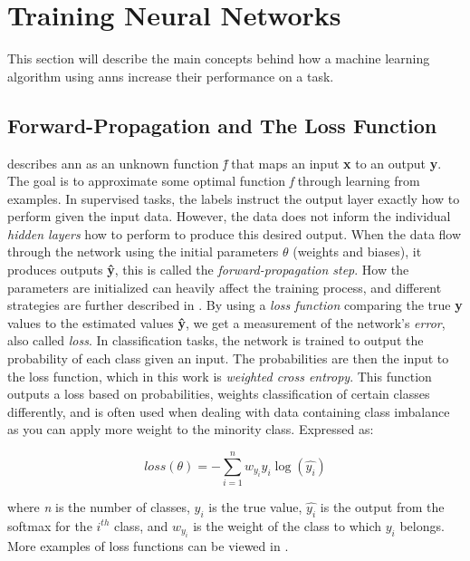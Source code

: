 \section{Training Neural Networks} \label{training neural networks}
    This section will describe the main concepts behind how a machine learning algorithm using \gls{ann}s increase their performance on a task. 

\subsection{Forward-Propagation and The Loss Function}
    \citeauthor{Goodfellow-et-al-2016_NN}\cite{Goodfellow-et-al-2016_NN} describes \gls{ann} as an unknown function \textit{\^{f}} that maps an input \textbf{x} to an output \textbf{y}. The goal is to approximate some optimal function \textit{f} through learning from examples. In supervised tasks, the labels instruct the output layer exactly how to perform given the input data. However, the data does not inform the individual \textit{hidden layers} how to perform to produce this desired output. When the data flow through the network using the initial parameters $\theta$ (weights and biases), it produces outputs \textbf{\^{y}}, this is called the \textit{forward-propagation step}. How the parameters are initialized can heavily affect the training process, and different strategies are further described in \citeauthor{Goodfellow-et-al-2016_param_init}\cite{Goodfellow-et-al-2016_param_init}. By using a \textit{loss function} comparing the true \textbf{y} values to the estimated values \textbf{\^{y}}, we get a measurement of the network's \textit{error}, also called \textit{loss}. In classification tasks, the network is trained to output the probability of each class given an input\cite{ho2019real_weighted_cross_entropy}. The probabilities are then the input to the loss function, which in this work is \textit{weighted cross entropy}. This function outputs a loss based on probabilities, weights classification of certain classes differently, and is often used when dealing with data containing class imbalance as you can apply more weight to the minority class. Expressed as:
    
        \begin{equation} \label{cross_entropy}
            loss(\theta) = - \sum^{n}_{i=1} w_{y_{i}}y_{i}\log(\hat{y_{i}})
        \end{equation}
    
    where \textit{n} is the number of classes, $y_{i}$ is the true value, $\hat{y_{i}}$ is the output from the softmax for the $i^{th}$ class, and $w_{y_{i}}$ is the weight of the class to which $y_{i}$ belongs. More examples of loss functions can be viewed in \citeauthor{mishra2017deep}\cite{mishra2017deep}.
    


